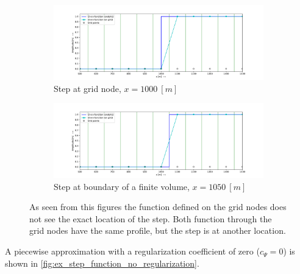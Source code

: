 \begin{figure}[H]
    \centering
    \begin{subfigure}[t]{0.49\textwidth}
        \centering
        \includegraphics[width=1.0\textwidth]{figures/regul_1_1d_scalar_dx100.pdf}
        \caption{Step at grid node, $x = 1000\ [m]$}
    \end{subfigure}
    \hfill
    \begin{subfigure}[t]{0.49\textwidth}
        \centering
        \includegraphics[width=1.0\textwidth]{figures/regul_2_1d_scalar_dx100.pdf}
        \caption{Step at boundary of a finite volume, $x = 1050\ [m]$}
    \end{subfigure}
    \caption{As seen from this figures the function defined on the grid nodes does not see the exact location of the step. Both function through the grid nodes have the same profile, but the step is at another location. \label{fig:straight_forward_discretization}}
\end{figure}
%
A piecewise approximation with a regularization coefficient of zero ($c_\Psi = 0$) is shown in \autoref{fig:ex_step_function_no_regularization}.
%
